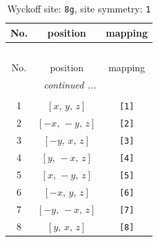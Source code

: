 \documentclass[fleqn,8pt]{jsarticle}
\begin{document}
\renewcommand{\arraystretch}{1.2}
\begin{longtable}{ccc}
\caption{Wyckoff site: {\tt 8g}, site symmetry: {\tt 1}}
 \\
 \hline \hline
No. & position & mapping \\ \hline \endfirsthead

\multicolumn{2}{l}{\tablename\ \thetable{}} \\
 \hline \hline
No. & position & mapping \\ \hline \endhead

 \hline \hline
\multicolumn{2}{r}{\footnotesize\it continued ...} \\ \endfoot

 \hline \hline
\multicolumn{2}{r}{} \\ \endlastfoot

1 & $\left[ x,\, y,\, z \right]$ & {\tt [1]} \\ \hline
2 & $\left[ - x,\, - y,\, z \right]$ & {\tt [2]} \\ \hline
3 & $\left[ - y,\, x,\, z \right]$ & {\tt [3]} \\ \hline
4 & $\left[ y,\, - x,\, z \right]$ & {\tt [4]} \\ \hline
5 & $\left[ x,\, - y,\, z \right]$ & {\tt [5]} \\ \hline
6 & $\left[ - x,\, y,\, z \right]$ & {\tt [6]} \\ \hline
7 & $\left[ - y,\, - x,\, z \right]$ & {\tt [7]} \\ \hline
8 & $\left[ y,\, x,\, z \right]$ & {\tt [8]} \\
\end{longtable}
\end{document}
